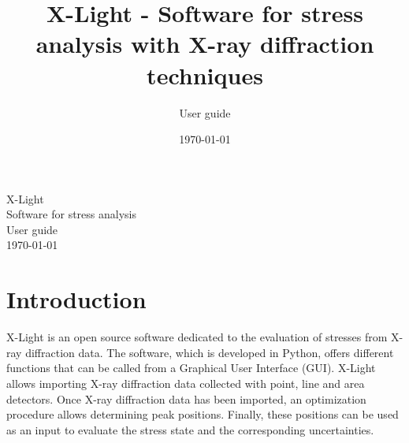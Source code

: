 \documentclass[french,a4paper]{report}
\title{X-Light - Software for stress analysis with X-ray diffraction techniques}
\author{User guide}
\date{\today}
\begin{document}
\sloppy
 

\begin{titlepage}
\centering
\vfill
{\Huge
X-Light\\
Software for stress analysis\\
\Large
\vskip1cm
User guide\\
\vskip1cm
\today\\
}    
\vfill
{}
\vfill
\vfill
\end{titlepage}

\tableofcontents 


\chapter{Introduction}

X-Light is an open source software dedicated to the evaluation of stresses from X-ray diffraction data. The software, which is developed in Python, offers different functions that can be called from a Graphical User Interface (GUI). X-Light allows importing X-ray diffraction data collected with point, line and area detectors. Once X-ray diffraction data has been imported, an optimization procedure allows determining peak positions. Finally, these positions can be used as an input to evaluate the stress state and the corresponding uncertainties.
\end{document}
